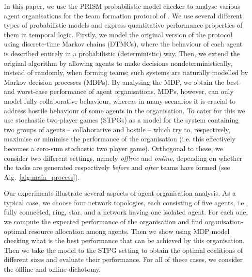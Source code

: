 \documentclass{llncs}
\newcommand{\aistis}[1]{\marginpar{\footnotesize \color{red} {\bf A:} \textsf{#1}}}
\begin{document}
In this paper, we use the PRISM probabilistic model checker \cite{KNP11} to analyse various agent organisations for the team formation protocol of \cite{gaston2005agent}.
We use several different types of probabilistic models
and express quantitative performance properties of them in temporal logic.
Firstly, we model the original version of the protocol using discrete-time Markov chains (DTMCs), where the behaviour of each agent is described entirely in a probabilistic (deterministic) way. Then, we extend the original algorithm  by allowing agents to make decisions nondeterministically, instead of randomly, when forming teams; such systems are naturally modelled by Markov decision processes (MDPs). By analysing the MDP, we obtain the best- and worst-case performance of agent organisations.
MDPs, however, can only model fully collaborative behaviour,
whereas in many scenarios it is crucial to address hostile behaviour of some agents in the organisation. To cater for this we use stochastic two-player games (STPGs) as a model for the system containing two groups of agents -- collaborative and hostile -- which try to, respectively, maximise
\aistis{Added a comment on zero-sum nature of the game.}
 or minimise the performance of the organisation (i.e. this effectively becomes a zero-sum stochastic two player game). Orthogonal to these, we consider two different settings, namely \emph{offline} and \emph{online}, depending on whether the tasks are generated respectively \emph{before} and \emph{after} teams have formed (see Alg.~\ref{alg:main_process}).


Our experiments illustrate several aspects of agent organisation analysis. As a typical case, we choose four network topologies, each consisting of five agents, i.e., fully connected, ring, star, and a network having one isolated agent. For each one, we compute the expected performance of the organisation and find organisation-optimal resource allocation among agents. Then we show using MDP model checking what is the best performance that can be achieved by this organisation. Then we take the model to the STPG setting to obtain the optimal coalitions of different sizes and evaluate their performance. For all of these cases, we consider the offline and online dichotomy.
\end{document}
